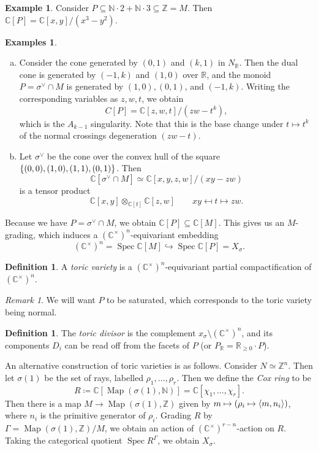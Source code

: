 \documentclass[leqno, openany]{memoir}
\theoremstyle{definition}
\newtheorem{defn}[thm]{Definition}
\newtheorem{exm}[thm]{Example}
\newtheorem{exms}[thm]{Examples}
\theoremstyle{remark}
\newtheorem{rmk}[thm]{Remark}
\theoremstyle{plain}
\theoremstyle{definition}
\theoremstyle{remark}
\newcommand{\N}{\mathbb{N}}
\newcommand{\R}{\mathbb{R}}
\newcommand{\C}{\mathbb{C}}
\newcommand{\Z}{\mathbb{Z}}
\newcommand{\on}[1]{\operatorname{#1}}
\DeclareMathOperator{\Spec}{Spec}
\begin{document}
\begin{exm}
    Consider $P \subseteq \N \cdot 2 + \N \cdot 3 \subseteq \Z = M$. Then $\C[P] = \C[x,y]/(x^3-y^2)$.
\end{exm}

\begin{exms}\leavevmode
    \begin{enumerate}[(a)]
        \item Consider the cone generated by $(0,1)$ and $(k,1)$ in $N_{\R}$. Then the dual cone is generated by $(-1,k)$ and $(1,0)$ over $\R$, and the monoid $P = \sigma^{\vee} \cap M$ is generated by $(1,0), (0,1)$, and $(-1, k)$. Writing the corresponding variables as $z,w,t$, we obtain
            \[ C[P] = \C[z,w,t]/(zw-t^k), \]
            which is the $A_{k-1}$ singularity. Note that this is the base change under $t \mapsto t^k$ of the normal crossings degeneration $(zw-t)$.
        \item Let $\sigma^{\vee}$ be the cone over the convex hull of the square $\qty{(0,0), (1,0), (1,1), (0,1)}$. Then 
            \[ \C[\sigma^{\vee} \cap M] \simeq \C[x,y,z,w] / (xy-zw) \]
            is a tensor product
            \[ \C[x,y] \otimes_{\C[t]} \C[z,w] \qquad xy \mapsfrom t \mapsto zw. \]
    \end{enumerate}
\end{exms}

Because we have $P = \sigma^{\vee} \cap M$, we obtain $\C[P] \subseteq \C[M]$. This gives us an $M$-grading, which induces a $(\C^{\times})^n$-equivariant embedding
\[ (\C^{\times})^n = \Spec \C[M] \hookrightarrow \Spec \C[P] = X_{\sigma}. \]

\begin{defn}
    A \textit{toric variety} is a $(\C^{\times})^n$-equivariant partial compactification of $(\C^{\times})^n$.
\end{defn}

\begin{rmk}
    We will want $P$ to be saturated, which corresponds to the toric variety being normal.
\end{rmk}

\begin{defn}
    The \textit{toric divisor} is the complement $x_{\sigma} \setminus (\C^{\times})^n$, and its components $D_i$ can be read off from the facets of $P$ (or $P_{\R} = \R_{\geq 0} \cdot P$).
\end{defn}

An alternative construction of toric varieties is as follows. Consider $N \simeq \Z^n$. Then let $\sigma(1)$ be the set of rays, labelled $\rho_1, \ldots, \rho_r$. Then we define the \textit{Cox ring} to be
\[ R \coloneqq \C[\on{Map}(\sigma(1), \N)] = \C[\chi_1, \ldots, \chi_r]. \]
Then there is a map $M \to \on{Map}(\sigma(1), \Z)$ given by $m \mapsto (\rho_i \mapsto \ev{m, n_i})$, where $n_i$ is the primitive generator of $\rho_i$. Grading $R$ by $\Gamma = \on{Map}(\sigma(1), \Z)/M$, we obtain an action of $(\C^{\times})^{r-n}$-action on $R$. Taking the categorical quotient $\Spec R^{\Gamma}$, we obtain $X_{\sigma}$.
\end{document}
